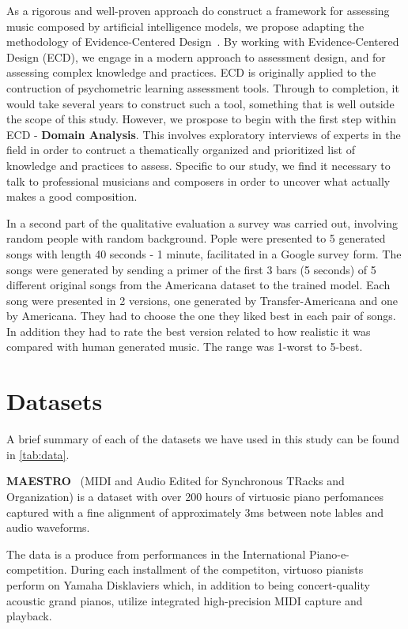 \documentclass{IEEEtran}
\begin{document}
As a rigorous and well-proven approach do construct a framework for assessing
music composed by artificial intelligence models, we propose adapting the
methodology of Evidence-Centered
Design~\cite{mislevy2003focus,mislevy2017evidence}.
By working with
Evidence-Centered Design (ECD), we engage in a modern approach to assessment
design, and for assessing complex knowledge and practices. ECD is originally
applied to the contruction of psychometric learning assessment tools. Through
to completion, it would take several years to construct such a tool,
something that is well outside the scope of this study. However, we prospose
to begin with the first step within ECD - \textbf{Domain Analysis}. This
involves exploratory interviews of experts in the field in order to contruct
a thematically organized and prioritized list of knowledge and practices to
assess. Specific to our study, we find it necessary to talk to professional
musicians and composers in order to uncover what actually makes a good
composition.

In a second part of the qualitative evaluation a survey was carried out,
involving random people with random background. Pople were presented to 5
generated songs with length 40 seconds - 1 minute, facilitated in a Google
survey form. The songs were generated by sending a primer of the first 3 bars
(5 seconds) of 5 different original songs from the Americana dataset to the
trained model. Each song were presented in 2 versions, one generated by
Transfer-Americana and one by Americana. They had to choose the one they
liked best in each pair of songs. In addition they had to rate the best
version related to how realistic it was compared with human generated music.
The range was 1-worst to 5-best.

\section{Datasets}

A brief summary of each of the datasets we have used in this study can be
found in \autoref{tab:data}.

\textbf{MAESTRO}~\cite{maestrodataset} (MIDI and Audio Edited for Synchronous
TRacks and Organization) is a dataset with over 200 hours of virtuosic piano
perfomances captured with a fine alignment of approximately 3ms between note
lables and audio waveforms.

The data is a produce from performances in the International
Piano-e-competition. During each installment of the competiton, virtuoso
pianists perform on Yamaha Disklaviers which, in addition to being
concert-quality acoustic grand pianos, utilize integrated high-precision MIDI
capture and playback.
\end{document}
